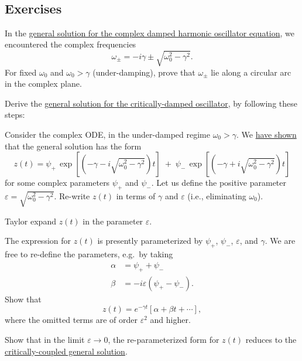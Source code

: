 \documentclass[11pt]{article}
\begin{document}
    \begin{center}
    \end{center}
    { \hspace*{\fill} \\}
    
    \subsection{Exercises}\label{exercises}

In the \protect\hyperlink{ansatz}{general solution for the complex
damped harmonic oscillator equation}, we encountered the complex
frequencies\[\omega_\pm = -i\gamma \pm \sqrt{\omega_0^2 - \gamma^2}.\]For
fixed \(\omega_0\) and \(\omega_0 > \gamma\) (under-damping), prove that
\(\omega_\pm\) lie along a circular arc in the complex plane.

Derive the \protect\hyperlink{critical_damping}{general solution for the
critically-damped oscillator}, by following these steps:

Consider the complex ODE, in the under-damped regime
\(\omega_0 > \gamma\). We \protect\hyperlink{ansatz}{have shown} that
the general solution has the
form\[z(t) = \psi_+ \, \exp\left[\left(-\gamma  - i \sqrt{\omega_0^2 - \gamma^2}\right)t\right] \; +\; \psi_- \, \exp\left[\left(-\gamma +i\sqrt{\omega_0^2 - \gamma^2}\right)t\right]\]for
some complex parameters \(\psi_+\) and \(\psi_-\). Let us define the
positive parameter \(\varepsilon = \sqrt{\omega_0^2 - \gamma^2}\).
Re-write \(z(t)\) in terms of \(\gamma\) and \(\varepsilon\) (i.e.,
eliminating \(\omega_0\)).

Taylor expand \(z(t)\) in the parameter \(\varepsilon\).

The expression for \(z(t)\) is presently parameterized by \(\psi_+\),
\(\psi_-\), \(\varepsilon\), and \(\gamma\). We are free to re-define
the parameters, e.g.~by
taking\[\begin{aligned}\alpha &= \psi_+ + \psi_- \\ \beta &= -i\varepsilon(\psi_+ - \psi_-).\end{aligned}\]Show
that\[z(t) = e^{-\gamma t}\left[\alpha + \beta t + \cdots\right],\]where
the omitted terms are of order \(\varepsilon^2\) and higher.

Show that in the limit \(\varepsilon \rightarrow 0\), the
re-parameterized form for \(z(t)\) reduces to the
\protect\hyperlink{critical_damping}{critically-coupled general
solution}.
\end{document}
